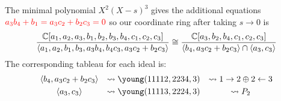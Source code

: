 \documentclass{article}
\begin{document}
The minimal polynomial $X^2(X-s)^3$ gives the additional equations ${\color{red} a_3b_4 + b_1 = a_3c_2 + b_2c_3 = 0}$ so our coordinate ring after taking $s \rightarrow 0$ is
$$\frac{\mathbb C[a_1,a_2,a_3,b_1,b_2,b_3,b_4,c_1,c_2,c_3]}{\langle a_1,a_2,b_1,b_3,a_3b_4,b_4c_3,a_3c_2+b_2c_3 \rangle} \cong \frac{\mathbb C[a_3,b_2,b_4,c_1,c_2,c_3]}{\langle b_4,a_3c_2+b_2c_3 \rangle \cap \langle a_3,c_3 \rangle}$$
The corresponding tableau for each ideal is:
\[\begin{array}{ccc}\vspace{1mm}
    \langle b_4,a_3c_2+b_2c_3 \rangle &\leadsto \young(11112,2234,3) &\leadsto 1 \rightarrow 2 \oplus 2 \leftarrow 3 \\ 
    \langle a_3,c_3 \rangle &\leadsto \young(11113,2224,3) &\leadsto P_2
\end{array}
\]
\end{document}

